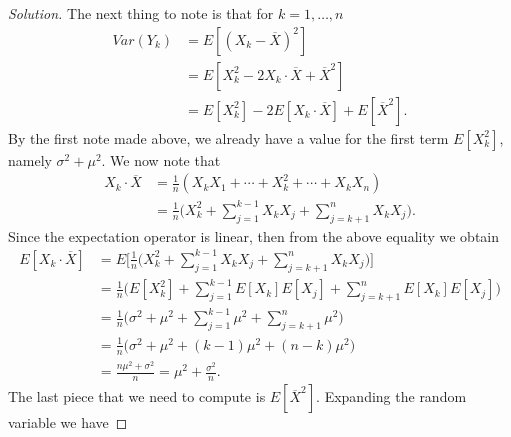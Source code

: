\documentclass[12pt]{article}
\newenvironment{solution}
{\renewcommand\qedsymbol{$\blacksquare$}\begin{proof}[Solution]}
{\end{proof}}
\begin{document}
\begin{enumerate}
\begin{enumerate}[(a)]
\begin{solution}
                        The next thing to note is that for $k=1, \dots, n$
                        \begin{align*}
                            Var(Y_k)&=E[(X_k-\overline{X})^2] \\
                            &=E[X_k^2-2X_k\cdot \overline{X}+\overline{X}^2] \\
                            &=E[X_k^2]-2E[X_k\cdot
                            \overline{X}]+E[\overline{X}^2].
                        \end{align*}
                        By the first note made above, we already have a value
                        for the first term $E[X_k^2]$, namely $\sigma^2+\mu^2$.
                        We now note that 
                        \begin{align*}
                            X_k\cdot
                            \overline{X}&=\frac{1}{n}(X_kX_1+\cdots+X_k^2+\cdots+X_kX_n)
                            \\ 
                            &=\frac{1}{n}\bigg(X_k^2+\sum_{j=1}^{k-1}X_kX_j
                            +\sum_{j=k+1}^{n}X_kX_j\bigg).
                        \end{align*}
                        Since the expectation operator is linear, then from the
                        above equality we obtain
                        \begin{align*}
                            E[X_k\cdot
                            \overline{X}]&=E\bigg[\frac{1}{n}\bigg(X_k^2
                            +\sum_{j=1}^{k-1}X_kX_j+\sum_{j=k+1}^{n}X_kX_j\bigg)\bigg]
                            \\
                            &=\frac{1}{n}\bigg(E[X_k^2]+\sum_{j=1}^{k-1}E[X_k]E[X_j]
                            +\sum_{j=k+1}^{n}E[X_k]E[X_j]\bigg) \\
                            &=\frac{1}{n}\bigg(\sigma^2+\mu^2+\sum_{j=1}^{k-1}\mu^2+
                            \sum_{j=k+1}^{n}\mu^2\bigg) \\
                            &=\frac{1}{n}\big(\sigma^2+\mu^2+(k-1)\mu^2+(n-k)\mu^2\big)
                            \\
                            &=\frac{n\mu^2+\sigma^2}{n}=\mu^2+\frac{\sigma^2}{n}.
                        \end{align*}
                        The last piece that we need to compute is
                        $E[\overline{X}^2]$. Expanding the random variable we
                        have 

\end{solution}
\end{enumerate}
\end{enumerate}
\end{document}
